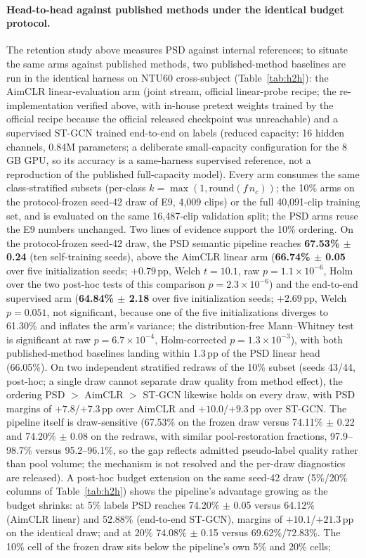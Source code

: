 \paragraph{Head-to-head against published methods under the identical budget protocol.}
The retention study above measures PSD against internal references; to situate the same arms against published methods, two published-method baselines are run in the identical harness on NTU60 cross-subject (Table~\ref{tab:h2h}): the AimCLR linear-evaluation arm (joint stream, official linear-probe recipe; the re-implementation verified above, with in-house pretext weights trained by the official recipe because the official released checkpoint was unreachable) and a supervised ST-GCN trained end-to-end on labels (reduced capacity: 16 hidden channels, 0.84M parameters; a deliberate small-capacity configuration for the 8\,GB GPU, so its accuracy is a same-harness supervised reference, not a reproduction of the published full-capacity model). Every arm consumes the same class-stratified subsets (per-class $k{=}\max(1,\mathrm{round}(f\,n_c))$; the 10\% arms on the protocol-frozen seed-42 draw of E9, 4{,}009 clips) or the full 40{,}091-clip training set, and is evaluated on the same 16{,}487-clip validation split; the PSD arms reuse the E9 numbers unchanged. Two lines of evidence support the 10\% ordering. On the protocol-frozen seed-42 draw, the PSD semantic pipeline reaches \textbf{67.53\% $\pm$ 0.24} (ten self-training seeds), above the AimCLR linear arm (\textbf{66.74\% $\pm$ 0.05} over five initialization seeds; $+0.79$\,pp, Welch $t{=}10.1$, raw $p{=}1.1\times10^{-6}$, Holm over the two post-hoc tests of this comparison $p{=}2.3\times10^{-6}$) and the end-to-end supervised arm (\textbf{64.84\% $\pm$ 2.18} over five initialization seeds; $+2.69$\,pp, Welch $p{=}0.051$, not significant, because one of the five initializations diverges to 61.30\% and inflates the arm's variance; the distribution-free Mann--Whitney test is significant at raw $p{=}6.7\times10^{-4}$, Holm-corrected $p{=}1.3\times10^{-3}$), with both published-method baselines landing within 1.3\,pp of the PSD linear head (66.05\%). On two independent stratified redraws of the 10\% subset (seeds 43/44, post-hoc; a single draw cannot separate draw quality from method effect), the ordering PSD $>$ AimCLR $>$ ST-GCN likewise holds on every draw, with PSD margins of $+7.8$/$+7.3$\,pp over AimCLR and $+10.0$/$+9.3$\,pp over ST-GCN. The pipeline itself is draw-sensitive (67.53\% on the frozen draw versus 74.11\% $\pm$ 0.22 and 74.20\% $\pm$ 0.08 on the redraws, with similar pool-restoration fractions, 97.9--98.7\% versus 95.2--96.1\%, so the gap reflects admitted pseudo-label quality rather than pool volume; the mechanism is not resolved and the per-draw diagnostics are released). A post-hoc budget extension on the same seed-42 draw (5\%/20\% columns of Table~\ref{tab:h2h}) shows the pipeline's advantage growing as the budget shrinks: at 5\% labels PSD reaches 74.20\% $\pm$ 0.05 versus 64.12\% (AimCLR linear) and 52.88\% (end-to-end ST-GCN), margins of $+10.1$/$+21.3$\,pp on the identical draw; and at 20\% 74.08\% $\pm$ 0.15 versus 69.62\%/72.83\%. The 10\% cell of the frozen draw sits below the pipeline's own 5\% and 20\% cells; 